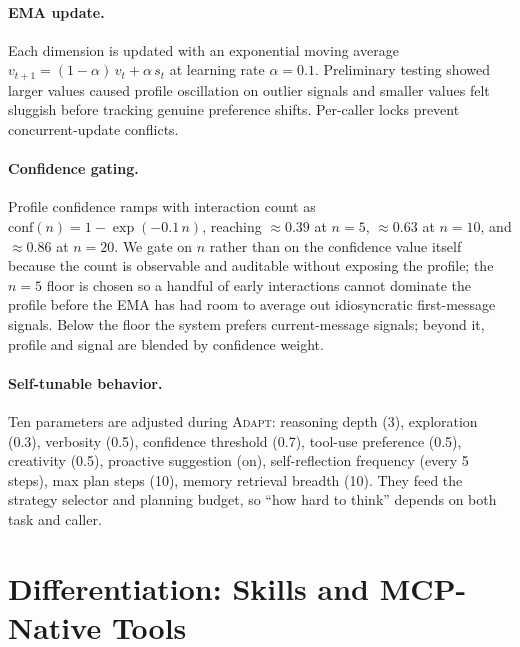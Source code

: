 \documentclass[11pt]{article}
\begin{document}
\paragraph{EMA update.} Each dimension is updated with an exponential moving average $v_{t+1} = (1-\alpha)\,v_t + \alpha\,s_t$ at learning rate $\alpha{=}0.1$. Preliminary testing showed larger values caused profile oscillation on outlier signals and smaller values felt sluggish before tracking genuine preference shifts. Per-caller locks prevent concurrent-update conflicts.

\paragraph{Confidence gating.} Profile confidence ramps with interaction count as $\text{conf}(n) = 1 - \exp(-0.1\,n)$, reaching $\approx 0.39$ at $n{=}5$, $\approx 0.63$ at $n{=}10$, and $\approx 0.86$ at $n{=}20$. We gate on $n$ rather than on the confidence value itself because the count is observable and auditable without exposing the profile; the $n{=}5$ floor is chosen so a handful of early interactions cannot dominate the profile before the EMA has had room to average out idiosyncratic first-message signals. Below the floor the system prefers current-message signals; beyond it, profile and signal are blended by confidence weight.

\paragraph{Self-tunable behavior.} Ten parameters are adjusted during \textsc{Adapt}: reasoning depth (3), exploration (0.3), verbosity (0.5), confidence threshold (0.7), tool-use preference (0.5), creativity (0.5), proactive suggestion (on), self-reflection frequency (every 5 steps), max plan steps (10), memory retrieval breadth (10). They feed the strategy selector and planning budget, so ``how hard to think'' depends on both task and caller.

\section{Differentiation: Skills and MCP-Native Tools}
\label{sec:skills}
\end{document}
